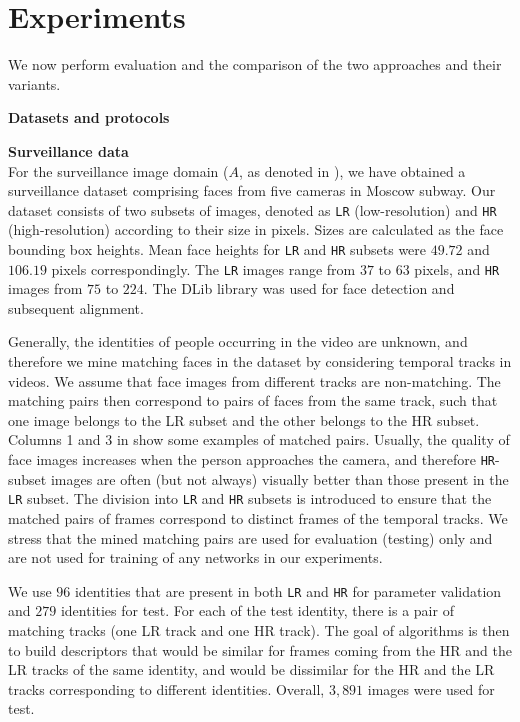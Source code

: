 \section{Experiments}
\label{sect:experiments}

We now perform evaluation and the comparison of the two approaches and their variants. 

\bigskip\indent\textbf{Datasets and protocols} 

\label{sect:datasets}
\bigskip\indent\textbf{Surveillance data}\\
\label{sect:surveillance}
For the surveillance image domain ($A$, as denoted in ), we have obtained a surveillance dataset comprising faces from five cameras in Moscow subway. Our dataset consists of two subsets of images, denoted as \texttt{LR} (low-resolution) and \texttt{HR} (high-resolution) according to their size in pixels. Sizes are calculated as the face bounding box heights. Mean face heights for \texttt{LR} and \texttt{HR} subsets were $49.72$ and $106.19$ pixels correspondingly. The \texttt{LR} images range from $37$ to $63$ pixels, and \texttt{HR} images from $75$ to $224$. The DLib \citep{dlib09} library was used for face detection and subsequent alignment. 
 
Generally, the identities of people occurring in the video are unknown, and therefore we mine matching faces in the dataset by considering temporal tracks in videos. We assume that face images from different tracks are non-matching. The matching pairs then correspond to pairs of faces from the same track, such that one image belongs to the LR subset and the other belongs to the HR subset. Columns 1 and 3 in  show some examples of matched pairs. Usually, the quality of face images increases when the person approaches the camera, and therefore \texttt{HR}-subset images are often (but not always) visually better than those present in the \texttt{LR} subset. The division into \texttt{LR} and \texttt{HR} subsets is introduced to ensure that the matched pairs of frames correspond to distinct frames of the temporal tracks. We stress that the mined matching pairs are used for evaluation (testing) only and are not used for training of any networks in our experiments.

We use $96$ identities that are present in both \texttt{LR} and \texttt{HR} for parameter validation and $279$ identities for test. For each of the test identity, there is a pair of matching tracks (one LR track and one HR track). The goal of algorithms is then to build descriptors that would be similar for frames coming from the HR and the LR tracks of the same identity, and would be dissimilar for the HR and the LR tracks corresponding to different identities. Overall, $3,891$ images were used for test.

